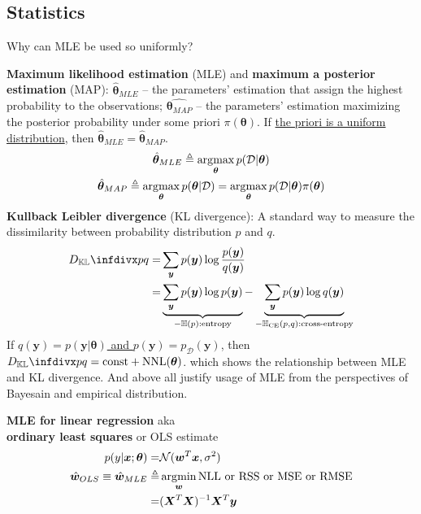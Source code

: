 \subsection{Statistics}

\begin{question}
    Why can MLE be used so uniformly?
\end{question}

\textbf{Maximum likelihood estimation} (MLE) and \textbf{maximum a posterior estimation} (MAP):
$\hat{\bm{\theta}}_{MLE}$ -- the parameters' estimation that assign the highest probability to the observations;
$\hat{\bm{\theta}_{MAP}}$ -- the parameters' estimation maximizing the posterior probability under some priori $\pi(\bm{\theta})$. 
If \uline{the priori is a uniform distribution}, 
then $\hat{\bm{\theta}}_{MLE}=\hat{\bm{\theta}}_{MAP}$.
\begin{gather}
    \hat{\bm{\theta}}_{MLE}
    \triangleq \operatorname*{\arg\!max}_{\bm{\theta}}p(\mathcal{D}|\bm{\theta})\\
    \hat{\bm{\theta}}_{MAP}
    \triangleq \operatorname*{\arg\!max}_{\bm{\theta}}p(\bm{\theta}|\mathcal{D})
    = \operatorname*{\arg\!max}_{\bm{\theta}}p(\mathcal{D}|\bm{\theta})\pi(\bm{\theta})
\end{gather}
\textbf{Kullback Leibler divergence} (KL divergence): 
A standard way to measure the dissimilarity between probability distribution $p$ and $q$.
\begin{align}
    \infdiv{p}{q}
    =& \sum_{\bm{y}}{p(\bm{y})\log\frac{p(\bm{y})}{q(\bm{y})}}\\
    =& \underbrace{\sum_{\bm{y}}{p(\bm{y})\log p(\bm{y})}}_{-\mathbb{H}(p)\text{:entropy}}
    - \underbrace{\sum_{\bm{y}}{p(\bm{y})\log q(\bm{y})}}_{-\mathbb{H}_{\text{CE}}(p,q)\text{:cross-entropy}}
\end{align}
If \uline{$q(\bm{y})=p(\bm{y}|\bm{\theta})$ and $p(\bm{y})=p_\mathcal{D}(\bm{y})$}, 
then $\infdiv{p}{q}=\text{const}+\mathrm{NNL}(\bm{\theta})$.
which shows the relationship between MLE and KL divergence.
And above all justify usage of MLE from the perspectives of Bayesain and empirical distribution.

\begin{example}
    \textbf{MLE for linear regression} aka\\
    \textbf{ordinary least squares} or OLS estimate
    \begin{align}
        p(y|\bm{x};\bm{\theta})
        =& \mathcal{N}(\bm{w}^T\bm{x},\sigma^2)\\
        \hat{\bm{w}}_{OLS}\equiv\hat{\bm{w}}_{MLE}
        \triangleq& \operatorname*{\arg\!min}_{\bm{w}}\text{NLL or RSS or MSE or RMSE}\\
        =& (\bm{X}^T\bm{X})^{-1}\bm{X}^T\bm{y}
    \end{align}
\end{example}


